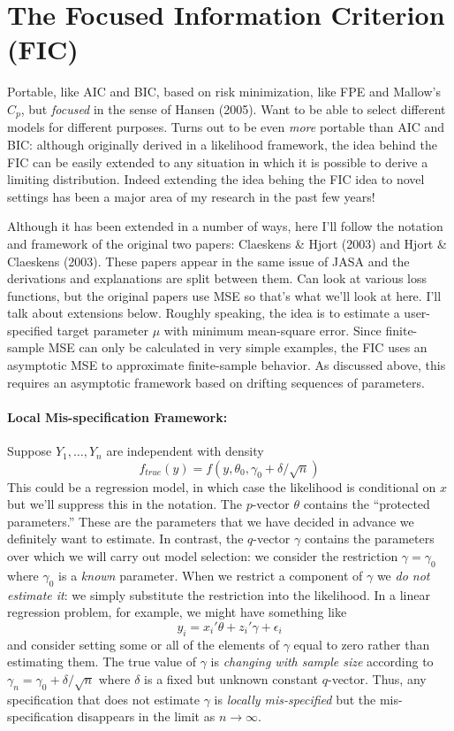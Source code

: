 \documentclass[12pt]{article}
\theoremstyle{definition}
\begin{document}
\section{The Focused Information Criterion (FIC)}
Portable, like AIC and BIC, based on risk minimization, like FPE and Mallow's $C_p$, but \emph{focused} in the sense of Hansen (2005). Want to be able to select different models for different purposes. Turns out to be even \emph{more} portable than AIC and BIC: although originally derived in a likelihood framework, the idea behind the FIC can be easily extended to any situation in which it is possible to derive a limiting distribution. Indeed extending the idea behing the FIC idea to novel settings has been a major area of my research in the past few years! 

Although it has been extended in a number of ways, here I'll follow the notation and framework of the original two papers: Claeskens \& Hjort (2003) and Hjort \& Claeskens (2003). These papers appear in the same issue of JASA and the derivations and explanations are split between them. Can look at various loss functions, but the original papers use MSE so that's what we'll look at here. I'll talk about extensions below. Roughly speaking, the idea is to estimate a user-specified target parameter $\mu$ with minimum mean-square error. Since finite-sample MSE can only be calculated in very simple examples, the FIC uses an asymptotic MSE to approximate finite-sample behavior. As discussed above, this requires an asymptotic framework based on drifting sequences of parameters. 

\paragraph{Local Mis-specification Framework:}
Suppose $Y_1, \hdots, Y_n$ are independent with density
	$$f_{true}(y)=f(y, \theta_0, \gamma_0 + \delta/\sqrt{n})$$
This could be a regression model, in which case the likelihood is conditional on $x$ but we'll suppress this in the notation. The $p$-vector $\theta$ contains the ``protected parameters.'' These are the parameters that we have decided in advance we definitely want to estimate. In contrast, the $q$-vector $\gamma$ contains the parameters over which we will carry out model selection: we consider the restriction $\gamma = \gamma_0$ where $\gamma_0$ is a \emph{known} parameter. When we restrict a component of $\gamma$ we \emph{do not estimate it}: we simply substitute the restriction into the likelihood. In a linear regression problem, for example, we might have something like
	$$y_i = x_i'\theta + z_i'\gamma + \epsilon_i$$
and consider setting some or all of the elements of $\gamma$ equal to zero rather than estimating them.  The true value of $\gamma$ is \emph{changing with sample size} according to $\gamma_n = \gamma_0 + \delta/\sqrt{n}$ where $\delta$ is a fixed but unknown constant $q$-vector. Thus, any specification that does not estimate $\gamma$ is \emph{locally mis-specified} but the mis-specification disappears in the limit as $n\rightarrow \infty$. 
\end{document}
